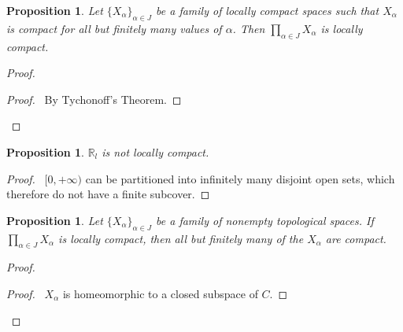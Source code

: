\documentclass{report}
\let\qed\relax
\newtheorem{prop}[lm]{Proposition}
\theoremstyle{definition}
\begin{document}
  \begin{prop}
   Let $\{ X_\alpha \}_{\alpha \in J}$ be a family of locally compact spaces
such that $X_\alpha$ is compact for all but finitely many values of $\alpha$.
Then $\prod_{\alpha \in J} X_\alpha$ is locally compact.
 \end{prop}

 \begin{proof}
  \pf
  \begin{proof}
    \pf\ By Tychonoff's Theorem.
  \end{proof}
  \qed
 \end{proof}

  \begin{prop}
   $\mathbb{R}_l$ is not locally compact.
 \end{prop}

 \begin{proof}
  \pf\ $[0, +\infty)$ can be partitioned into infinitely many disjoint open
sets, which therefore do not have a finite subcover. \qed
 \end{proof}

    \begin{prop}
   Let $\{X_\alpha\}_{\alpha \in J}$ be a family of nonempty topological
spaces. If    $\prod_{\alpha \in J} X_\alpha$ is locally compact, then all but
finitely many of the $X_\alpha$ are compact.
 \end{prop}

 \begin{proof}
  \pf
  \begin{proof}
    \pf\ $X_\alpha$ is homeomorphic to a closed subspace of $C$.
  \end{proof}
  \qed
 \end{proof}
\end{document}
